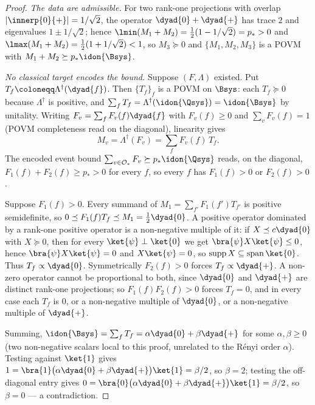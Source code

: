 \begin{proof}
\emph{The data are admissible.} For two rank-one projections with overlap
$|\innerp{0}{+}|=1/\sqrt2$, the operator $\dyad{0}+\dyad{+}$ has trace $2$ and
eigenvalues $1\pm1/\sqrt2$; hence
$\lmin(M_1+M_2)=\tfrac12(1-1/\sqrt2)=p_{*}>0$ and
$\lmax(M_1+M_2)=\tfrac12(1+1/\sqrt2)<1$, so $M_3\succeq0$ and $\{M_1,M_2,M_3\}$
is a POVM with $M_1+M_2\succeq p_{*}\idon{\Bsys}$.

\emph{No classical target encodes the bound.} Suppose $(F,\Lambda)$ existed.
Put $T_f\coloneqq\Lambda^{\dagger}(\dyad{f})$. Then $\{T_f\}_f$ is a POVM on
$\Bsys$: each $T_f\succeq0$ because $\Lambda^{\dagger}$ is positive, and
$\sum_fT_f=\Lambda^{\dagger}(\idon{\Qsys})=\idon{\Bsys}$ by unitality. Writing
$F_v=\sum_fF_v(f)\dyad{f}$ with $F_v(f)\ge0$ and $\sum_vF_v(f)=1$ (POVM
completeness read on the diagonal), linearity gives
\begin{equation*}
  M_v=\Lambda^{\dagger}(F_v)=\sum_fF_v(f)\,T_f .
\end{equation*}
The encoded event bound $\sum_{v\in\mathcal{O}_{*}}F_v\succeq p_{*}\idon{\Qsys}$
reads, on the diagonal, $F_1(f)+F_2(f)\ge p_{*}>0$ for every $f$, so every $f$
has $F_1(f)>0$ or $F_2(f)>0$.

Suppose $F_1(f)>0$. Every summand of $M_1=\sum_{f'}F_1(f')T_{f'}$ is positive
semidefinite, so $0\preceq F_1(f)T_f\preceq M_1=\tfrac12\dyad{0}$. A positive
operator dominated by a rank-one positive operator is a non-negative multiple
of it: if $X\preceq c\dyad{0}$ with $X\succeq0$, then for every
$\ket{\psi}\perp\ket{0}$ we get $\bra{\psi}X\ket{\psi}\le0$, hence
$\bra{\psi}X\ket{\psi}=0$ and $X\ket{\psi}=0$, so $\operatorname{supp}X
\subseteq\operatorname{span}\ket{0}$. Thus $T_f\propto\dyad{0}$. Symmetrically
$F_2(f)>0$ forces $T_f\propto\dyad{+}$. A non-zero operator cannot be
proportional to both, since $\dyad{0}$ and $\dyad{+}$ are distinct rank-one
projections; so $F_1(f)F_2(f)>0$ forces $T_f=0$, and in every case each $T_f$
is $0$, or a non-negative multiple of $\dyad{0}$, or a non-negative multiple of
$\dyad{+}$.

Summing, $\idon{\Bsys}=\sum_fT_f=\alpha\dyad{0}+\beta\dyad{+}$ for some
$\alpha,\beta\ge0$ (two non-negative scalars local to this proof, unrelated
to the R\'enyi order $\alpha$). Testing against $\ket{1}$ gives
$1=\bra{1}\big(\alpha\dyad{0}+\beta\dyad{+}\big)\ket{1}=\beta/2$, so
$\beta=2$; testing the off-diagonal entry gives
$0=\bra{0}\big(\alpha\dyad{0}+\beta\dyad{+}\big)\ket{1}=\beta/2$, so
$\beta=0$ --- a contradiction.
\end{proof}
